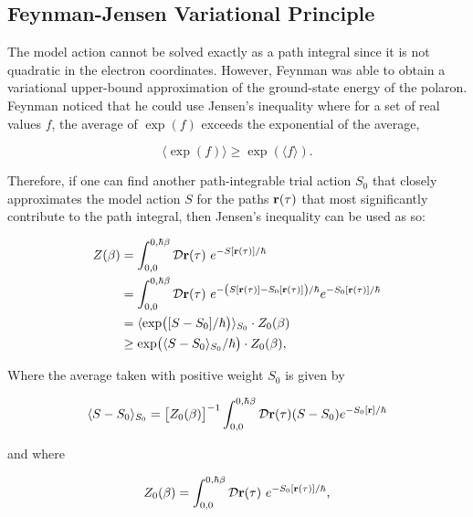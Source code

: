 \subsection{Feynman-Jensen Variational Principle}
\label{subsec:2-2-2}

The model action cannot be solved exactly as a path integral since it is not quadratic in the electron coordinates. However, Feynman was able to obtain a variational upper-bound approximation of the ground-state energy of the polaron. Feynman noticed that he could use Jensen's inequality where for a set of real values $f$, the average of $\exp(f)$ exceeds the exponential of the average,

\begin{equation}
    \langle \exp(f) \rangle \geq \exp(\langle f \rangle).
\end{equation}

Therefore, if one can find another path-integrable trial action $S_0$ that closely approximates the model action $S$ for the paths $\vb{r}(\tau)$ that most significantly contribute to the path integral, then Jensen's inequality can be used as so:

\begin{equation}
    \begin{aligned}
        Z(\beta) &= \int_{0, 0}^{0, \hbar\beta} \mathcal{D} \vb{r}(\tau)\ e^{-S[\mathbf{r}(\tau)]/\hbar} \\ &= \int_{0, 0}^{0, \hbar\beta} \mathcal{D} \vb{r}(\tau)\ e^{-\left(S[\mathbf{r}(\tau)] - S_0[\mathbf{r}(\tau)]\right) / \hbar} e^{-S_0[\mathbf{r}(\tau)]/\hbar} \\
        &= \langle \exp( [S - S_0]  / \hbar) \rangle_{S_0} \cdot Z_0(\beta) \\
        &\geq \exp(\langle S - S_0 \rangle_{S_0} / \hbar) \cdot Z_0(\beta) ,
    \end{aligned}
\end{equation}

Where the average taken with positive weight $S_0$ is given by

\begin{equation}
    \langle S-S_0 \rangle_{S_0} = \left[ Z_0(\beta) \right]^{-1} \int_{0, 0}^{0, \hbar\beta} \mathcal{D}\vb{r}(\tau) (S-S_0) e^{-S_0[\vb{r}]/ \hbar}
\end{equation}

and where

\begin{equation}
    Z_0(\beta) = \int_{0, 0}^{0, \hbar\beta} \mathcal{D} \vb{r}(\tau)\ e^{-S_0[\mathbf{r}(\tau)]/\hbar} ,
\end{equation}

